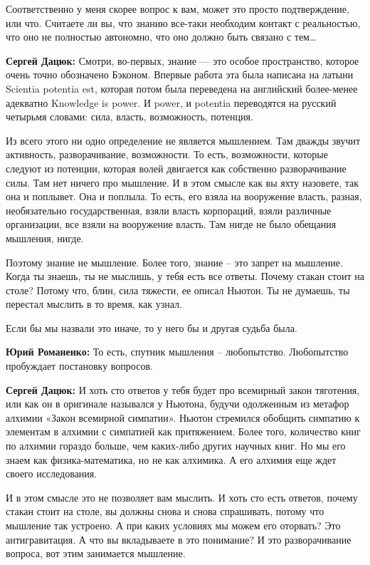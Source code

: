 Соответственно у меня скорее вопрос к вам, может это просто подтверждение, или
что. Считаете ли вы, что знанию все-таки необходим контакт с реальностью, что
оно не полностью автономно, что оно должно быть связано с тем…

\textbf{Сергей Дацюк:} Смотри, во-первых, знание — это особое пространство, которое
очень точно обозначено Бэконом. Впервые работа эта была написана на латыни
Scientia potentia est, которая потом была переведена на английский более-менее
адекватно Knowledge is power. И power, и potentia переводятся на русский
четырьмя словами: сила, власть, возможность, потенция.

Из всего этого ни одно определение не является мышлением. Там дважды звучит
активность, разворачивание, возможности. То есть, возможности, которые следуют
из потенции, которая волей двигается как собственно разворачивание силы. Там
нет ничего про мышление. И в этом смысле как вы яхту назовете, так она и
поплывет. Она и поплыла. То есть, его взяла на вооружение власть, разная,
необязательно государственная, взяли власть корпораций, взяли различные
организации, все взяли на вооружение власть. Там нигде не было обещания
мышления, нигде.

Поэтому знание не мышление. Более того, знание – это запрет на мышление. Когда
ты знаешь, ты не мыслишь, у тебя есть все ответы. Почему стакан стоит на столе?
Потому что, блин, сила тяжести, ее описал Ньютон. Ты не думаешь, ты перестал
мыслить в то время, как узнал.

Если бы мы назвали это иначе, то у него бы и другая судьба была.

\textbf{Юрий Романенко:} То есть, спутник мышления – любопытство. Любопытство пробуждает
постановку вопросов.

\textbf{Сергей Дацюк:} И хоть сто ответов у тебя будет про всемирный закон тяготения,
или как он в оригинале назывался у Ньютона, будучи одолженным из метафор
алхимии «Закон всемирной симпатии». Ньютон стремился обобщить симпатию к
элементам в алхимии с симпатией как притяжением. Более того, количество книг по
алхимии гораздо больше, чем каких-либо других научных книг. Но мы его знаем как
физика-математика, но не как алхимика. А его алхимия еще ждет своего
исследования.

И в этом смысле это не позволяет вам мыслить. И хоть сто есть ответов, почему
стакан стоит на столе, вы должны снова и снова спрашивать, потому что мышление
так устроено. А при каких условиях мы можем его оторвать? Это антигравитация. А
что вы вкладываете в это понимание? И это разворачивание вопроса, вот этим
занимается мышление.

